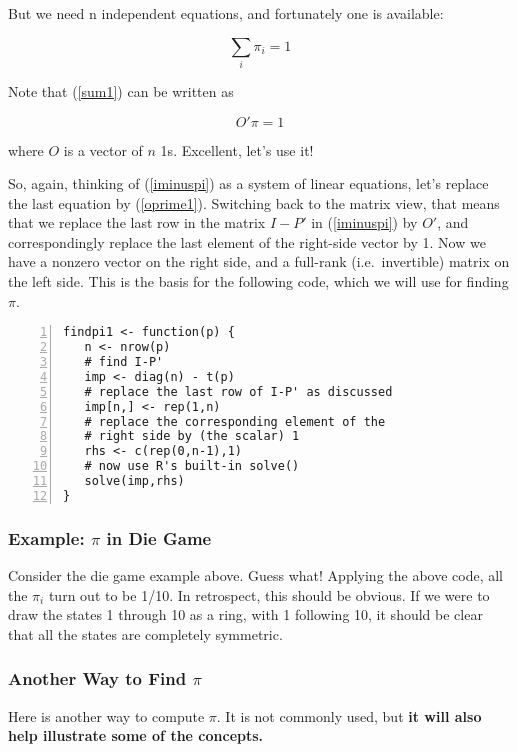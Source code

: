 But we need n independent equations, and fortunately one is available:

\begin{equation}
\label{sum1}
\sum_{i}\pi_{i}=1
\end{equation}

Note that (\ref{sum1}) can be written as

\begin{equation}
\label{oprime1}
O' \pi = 1
\end{equation}

where $O$ is a vector of $n$ 1s.   Excellent, let's use it!

So, again, thinking of (\ref{iminuspi}) as a system of linear equations,
let's replace the last equation by (\ref{oprime1}).  Switching back to
the matrix view, that means that we replace the last row in the matrix
$I - P'$ in (\ref{iminuspi}) by $O'$, and correspondingly replace the
last element of the right-side vector by 1.  Now we have a nonzero
vector on the right side, and a full-rank (i.e.\ invertible) matrix on
the left side.  This is the basis for the following code, which we will
use for finding $\pi$.

\begin{lstlisting}[numbers=left]
findpi1 <- function(p) {
   n <- nrow(p)
   # find I-P'
   imp <- diag(n) - t(p)  
   # replace the last row of I-P' as discussed
   imp[n,] <- rep(1,n)
   # replace the corresponding element of the 
   # right side by (the scalar) 1
   rhs <- c(rep(0,n-1),1)
   # now use R's built-in solve()
   solve(imp,rhs)
}
\end{lstlisting}

\subsubsection{Example:  $\pi$ in Die Game}

Consider the die game example above.  Guess what!  Applying the above
code, all the $\pi_i$ turn out to be 1/10.  In retrospect, this should
be obvious.  If we were to draw the states 1 through 10 as a ring, with
1 following 10, it should be clear that all the states are completely
symmetric.

\subsubsection{Another Way to Find $\pi$}

Here is another way to compute $\pi$.  It is not commonly used, but {\bf
it will also help illustrate some of the concepts.}  

